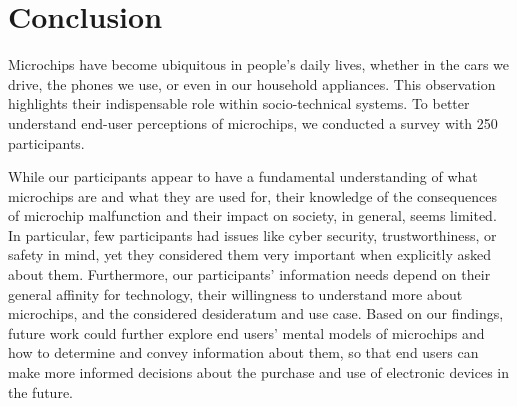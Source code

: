 \section{Conclusion}
\label{xhw_study::sec::conclusion}
Microchips have become ubiquitous in people's daily lives, whether in the cars we drive, the phones we use, or even in our household appliances.
This observation highlights their indispensable role within socio-technical systems.
To better understand end-user perceptions of microchips, we conducted a survey with 250 participants.

While our participants appear to have a fundamental understanding of what microchips are and what they are used for, their knowledge of the consequences of microchip malfunction and their impact on society, in general, seems limited.
In particular, few participants had issues like cyber security, trustworthiness, or safety in mind, yet they considered them very important when explicitly asked about them.
Furthermore, our participants' information needs depend on their general affinity for technology, their willingness to understand more about microchips, and the considered desideratum and use case.
Based on our findings, future work could further explore end users' mental models of microchips and how to determine and convey information about them, so that end users can make more informed decisions about the purchase and use of electronic devices in the future.